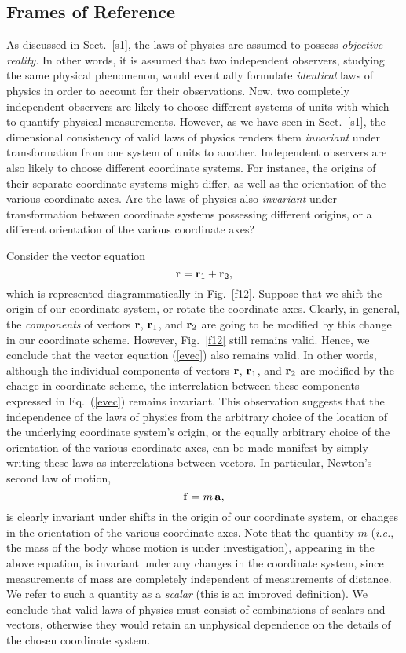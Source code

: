 \subsection{Frames of Reference}\label{frames}
As discussed in Sect.~\ref{s1}, the laws of physics are assumed to possess {\em objective reality}. 
In other words, it is assumed that two independent observers, studying the same physical phenomenon,
would eventually formulate {\em identical}\/ laws of physics in order to account for their
observations. Now, two completely independent observers are likely to choose different systems of units
with which to quantify physical measurements. However, as we have seen in Sect.~\ref{s1}, the
dimensional consistency of valid laws of physics renders them {\em invariant} under transformation from
one system of units to another. Independent observers are also likely to choose
different coordinate systems. For instance, the origins of their separate coordinate systems might
differ, as well as the orientation of the various coordinate axes. Are the laws of physics also
{\em invariant} under transformation between coordinate systems possessing different origins,
or a different orientation of the various coordinate axes?

Consider the vector equation
\begin{equation}\label{evec}
{\bf r}  = {\bf r}_1 + {\bf r}_2,
\end{equation}
which is represented diagrammatically in Fig.~\ref{f12}. Suppose that we shift the origin
of our coordinate system, or rotate the coordinate axes. Clearly, in general, the {\em components}
of vectors ${\bf r}$, ${\bf r}_1$, and ${\bf r}_2$ are going to be modified by this change
in our coordinate scheme.
However, Fig.~\ref{f12} still remains valid. Hence, we conclude that the vector
equation (\ref{evec}) also  remains valid. In other words, although the individual
components of vectors  ${\bf r}$, ${\bf r}_1$, and ${\bf r}_2$ are modified by the change in
coordinate scheme, the interrelation between these components expressed in Eq.~(\ref{evec}) remains
invariant.
This observation suggests that the independence of the laws of
physics from the arbitrary choice of  the location of  the underlying coordinate system's origin,
or the equally arbitrary choice of the orientation of the various coordinate axes, can be made
manifest by simply writing these laws as interrelations between vectors. 
In particular, Newton's second law of motion,
\begin{equation}
{\bf f} = m\,{\bf a},
\end{equation}
is clearly invariant under shifts in the origin of our coordinate system, or changes
in the orientation of the various coordinate axes. Note that the quantity $m$
({\em i.e.}, the mass of the body whose motion is under investigation),
appearing in the above equation, is invariant under any changes in the coordinate
system, since measurements
of mass are completely independent of measurements of distance. We refer to
such a quantity as a {\em scalar} (this is an improved definition). 
We conclude that valid laws
of physics must consist of combinations of scalars and vectors, otherwise
they would retain an unphysical dependence on the details of the chosen coordinate system.

